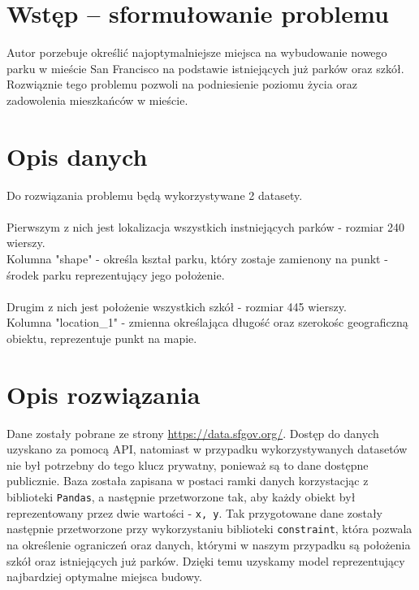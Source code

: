 \documentclass[10pt]{article}
\begin{document}
\graphicspath{{images/}}


\pagestyle{fancy}



\section{Wstęp -- sformułowanie problemu}
\label{sec:wstep}

Autor porzebuje określić najoptymalniejsze miejsca na wybudowanie nowego parku w mieście San Francisco na podstawie istniejących już parków oraz szkół.\\
Rozwiąznie tego problemu pozwoli na podniesienie poziomu życia oraz zadowolenia mieszkańców w mieście.

\section{Opis danych}
Do rozwiązania problemu będą wykorzystywane 2 datasety.\\\\
Pierwszym z nich jest lokalizacja wszystkich instniejących parków - rozmiar 240 wierszy. \\
Kolumna "shape" - określa kształ parku, który zostaje zamienony na punkt - środek parku reprezentujący jego położenie.\\ \\
Drugim z nich jest położenie wszystkich szkół - rozmiar 445 wierszy.\\
Kolumna "location\_1" - zmienna określająca długość oraz szerokośc geograficzną obiektu, reprezentuje punkt na mapie.

\section{Opis rozwiązania}

Dane zostały pobrane ze strony \url{https://data.sfgov.org/}. Dostęp do danych uzyskano za pomocą API, natomiast w przypadku wykorzystywanych datasetów nie był potrzebny do tego klucz prywatny, ponieważ są to dane dostępne publicznie. Baza została zapisana w postaci ramki danych korzystacjąc z biblioteki \texttt{Pandas}, a następnie przetworzone tak, aby każdy obiekt był reprezentowany przez dwie wartości - \texttt{x, y}. Tak przygotowane dane zostały następnie przetworzone przy wykorzystaniu biblioteki \texttt{constraint}, która pozwala na określenie ograniczeń oraz danych, którymi w naszym przypadku są położenia szkół oraz istniejących już parków. Dzięki temu uzyskamy model reprezentujący najbardziej optymalne miejsca budowy.
\end{document}
